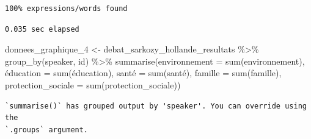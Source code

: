 \documentclass[
  letterpaper,
  DIV=11,
  numbers=noendperiod]{scrartcl}
\newenvironment{Shaded}{\begin{snugshade}}{\end{snugshade}}
\newcommand{\AttributeTok}[1]{\textcolor[rgb]{0.40,0.45,0.13}{#1}}
\newcommand{\FunctionTok}[1]{\textcolor[rgb]{0.28,0.35,0.67}{#1}}
\newcommand{\NormalTok}[1]{\textcolor[rgb]{0.00,0.23,0.31}{#1}}
\newcommand{\OtherTok}[1]{\textcolor[rgb]{0.00,0.23,0.31}{#1}}
\newcommand{\SpecialCharTok}[1]{\textcolor[rgb]{0.37,0.37,0.37}{#1}}
\begin{document}
\begin{verbatim}
100% expressions/words found
\end{verbatim}

\begin{verbatim}
0.035 sec elapsed
\end{verbatim}

\begin{Shaded}
\begin{Highlighting}[]
\NormalTok{donnees\_graphique\_4 }\OtherTok{\textless{}{-}}\NormalTok{ debat\_sarkozy\_hollande\_resultats }\SpecialCharTok{\%\textgreater{}\%} \FunctionTok{group\_by}\NormalTok{(speaker, id) }\SpecialCharTok{\%\textgreater{}\%} \FunctionTok{summarise}\NormalTok{(}\AttributeTok{environnement =} \FunctionTok{sum}\NormalTok{(environnement), é}\AttributeTok{ducation =} \FunctionTok{sum}\NormalTok{(éducation), santé }\OtherTok{=} \FunctionTok{sum}\NormalTok{(santé), }\AttributeTok{famille =} \FunctionTok{sum}\NormalTok{(famille), }\AttributeTok{protection\_sociale =} \FunctionTok{sum}\NormalTok{(protection\_sociale))}
\end{Highlighting}
\end{Shaded}

\begin{verbatim}
`summarise()` has grouped output by 'speaker'. You can override using the
`.groups` argument.
\end{verbatim}
\end{document}
